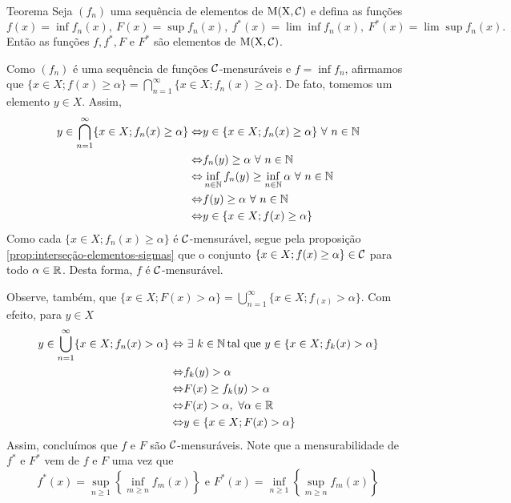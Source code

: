 \begin{env}{Teorema}
\label{teo:mensurabilidade-sequencia-funcoes-mensuraveis}
	Seja $(f_n)$ uma sequência de elementos de $\operatorname{M(X, \mathcal{C} )}$ e defina as funções
	$$f(x) = \inf f_n(x),\  
	F(x) = \sup f_n(x),\  
	f^*(x) = \lim\inf f_n(x),\   
	F^*(x) = \lim\sup f_n(x).$$
	Então as funções $f, f^*, F$ e $F^*$ são elementos de $\operatorname{M(X, \mathcal{C} )}$.
\end{env}
\begin{prova}
	Como $(f_n)$ é uma sequência de funções $\operatorname{\mathcal{C}}$-mensuráveis e $f = \inf f_n$, afirmamos que $\{x \in X; f(x) \geq \alpha\} = \displaystyle \bigcap_{n = 1}^\infty \{x \in X; f_n(x) \geq \alpha\}$.
	De fato, tomemos um elemento $y \in X$.
	Assim, 
		\begin{align*}
			y \in \bigcap_{n = 1}^\infty \{x \in X; f_n(x) \geq \alpha\} \Leftrightarrow	&
			y \in \{x \in X; f_n(x) \geq \alpha\}\ \forall\  n \in \N\\
			\Leftrightarrow	&	
			f_n(y) \geq \alpha\ \forall \ n \in \N\\
			\Leftrightarrow	&	
			\inf_{n \in \N}f_n(y) \geq \inf_{n \in \N}\alpha\ \forall \ n \in \N\\
			\Leftrightarrow	&	
			f(y) \geq \alpha\ \forall\  n \in \N\\
			\Leftrightarrow	&
			y \in \{x \in X; f(x) \geq \alpha\}
		\end{align*}
	Como cada $\{x \in X; f_n(x) \geq \alpha\}$ é $\operatorname{\mathcal{C}}$-mensurável, segue pela proposição \ref{prop:interseção-elementos-sigmas} que o conjunto $\{x \in X; f(x) \geq \alpha\} \in \operatorname{\mathcal{C}}$ para todo $\alpha \in \mathbb{R}$.
	Desta forma, $f$ é $\operatorname{\mathcal{C}}$-mensurável.
	
	Observe, também, que $\{x \in X; F(x) >\alpha\} = \displaystyle \bigcup_{n = 1}^\infty \{x \in X; f_(x) >\alpha\}$.
	Com efeito, para $y \in X$ 
	\begin{align*}
		y \in \bigcup_{n = 1}^\infty \{x \in X; f_n(x) > \alpha\} \Leftrightarrow	&
		\ \exists\ k \in \operatorname{\mathbb{N}} \textrm{tal que\ } y \in \{x \in X; f_k(x) > \alpha\}\\
		\Leftrightarrow	&	
		f_k(y) > \alpha\\
		\Leftrightarrow	&	
		F(x) \geq f_k(y) > \alpha\\
		\Leftrightarrow	&	
		F(x) > \alpha,\ \forall \alpha \in \mathbb{R}\\
		\Leftrightarrow	&
		y \in \{x \in X; F(x) > \alpha\}
	\end{align*}
	Assim, concluímos que $f$ e $F$ são $\operatorname{\mathcal{C}}$-mensuráveis. 
	Note que a mensurabilidade de $f^*$ e $F^*$ vem de $f$ e $F$ uma vez que
	$$
	f^*(x) = \sup_{n \geq 1} \left\{\inf_{m \geq n} f_m(x)\right\}
	\textrm{\ e\ }
	F^*(x) = \inf_{n \geq 1} \left\{\sup_{m \geq n} f_m(x)\right\}
	$$
\end{prova}
